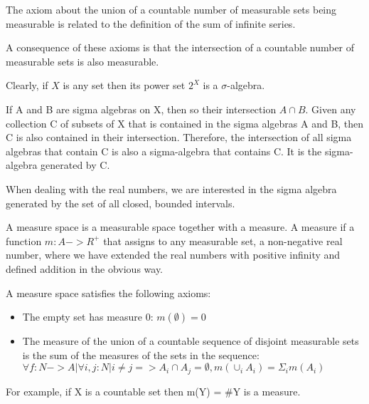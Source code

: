 \documentclass[11pt]{amsart}
\begin{document}
The axiom about the union of a countable number of measurable sets being measurable is related to the definition of the sum of infinite series.

A consequence of these axioms is that the intersection of a countable number of measurable sets is also measurable.

Clearly, if $X$ is any set then its power set $2^X$ is a $\sigma$-algebra.

If A and B are sigma algebras on X, then so their intersection $A \cap B$.
Given any collection C of subsets of X that is contained in the sigma algebras A and B, then C is also contained in their intersection.
Therefore, the intersection of all sigma algebras that contain C is also a sigma-algebra that contains C. It is the sigma-algebra generated by C.

When dealing with the real numbers, we are interested in the sigma algebra generated by the set of all closed, bounded intervals. 

A measure space is a measurable space together with a measure. 
A measure if a function $m: A -> R^{+}$ that assigns to any measurable set, a non-negative real number, where we have extended the real numbers with positive infinity and defined addition in the obvious way.

A measure space satisfies the following axioms:

\begin{itemize}
\item The empty set has measure 0: $m(\emptyset) = 0$
\item The measure of the union of a countable sequence of disjoint measurable sets is the sum of the measures of the sets in the sequence: $\forall f: N -> A | \forall i, j : N | i \neq j => A_i \cap A_j = \emptyset, m(\cup_i A_i) = \Sigma_i m(A_i)$
\end{itemize}

For example, if X is a countable set then m(Y) = #Y is a measure.




\end{document}
